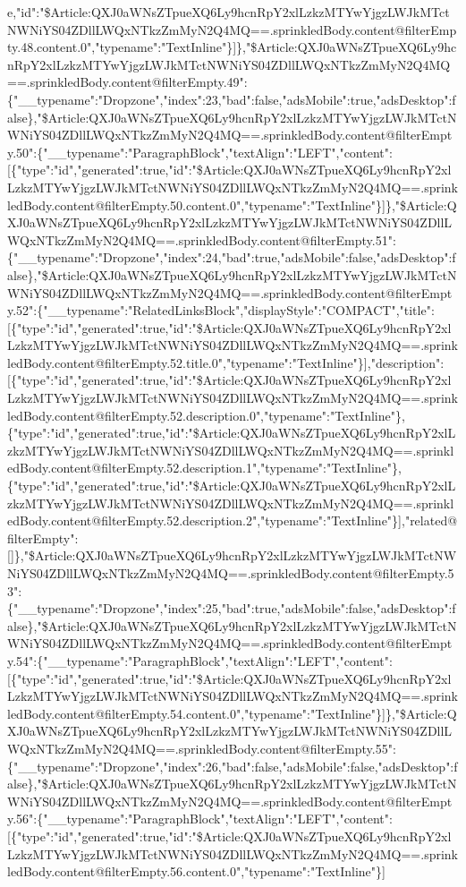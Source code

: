 e,"id":"\$Article:QXJ0aWNsZTpueXQ6Ly9hcnRpY2xlLzkzMTYwYjgzLWJkMTctNWNiYS04ZDllLWQxNTkzZmMyN2Q4MQ==.sprinkledBody.content@filterEmpty.48.content.0","typename":"TextInline"\}{]}\},"\$Article:QXJ0aWNsZTpueXQ6Ly9hcnRpY2xlLzkzMTYwYjgzLWJkMTctNWNiYS04ZDllLWQxNTkzZmMyN2Q4MQ==.sprinkledBody.content@filterEmpty.49":\{"\_\_typename":"Dropzone","index":23,"bad":false,"adsMobile":true,"adsDesktop":false\},"\$Article:QXJ0aWNsZTpueXQ6Ly9hcnRpY2xlLzkzMTYwYjgzLWJkMTctNWNiYS04ZDllLWQxNTkzZmMyN2Q4MQ==.sprinkledBody.content@filterEmpty.50":\{"\_\_typename":"ParagraphBlock","textAlign":"LEFT","content":{[}\{"type":"id","generated":true,"id":"\$Article:QXJ0aWNsZTpueXQ6Ly9hcnRpY2xlLzkzMTYwYjgzLWJkMTctNWNiYS04ZDllLWQxNTkzZmMyN2Q4MQ==.sprinkledBody.content@filterEmpty.50.content.0","typename":"TextInline"\}{]}\},"\$Article:QXJ0aWNsZTpueXQ6Ly9hcnRpY2xlLzkzMTYwYjgzLWJkMTctNWNiYS04ZDllLWQxNTkzZmMyN2Q4MQ==.sprinkledBody.content@filterEmpty.51":\{"\_\_typename":"Dropzone","index":24,"bad":true,"adsMobile":false,"adsDesktop":false\},"\$Article:QXJ0aWNsZTpueXQ6Ly9hcnRpY2xlLzkzMTYwYjgzLWJkMTctNWNiYS04ZDllLWQxNTkzZmMyN2Q4MQ==.sprinkledBody.content@filterEmpty.52":\{"\_\_typename":"RelatedLinksBlock","displayStyle":"COMPACT","title":{[}\{"type":"id","generated":true,"id":"\$Article:QXJ0aWNsZTpueXQ6Ly9hcnRpY2xlLzkzMTYwYjgzLWJkMTctNWNiYS04ZDllLWQxNTkzZmMyN2Q4MQ==.sprinkledBody.content@filterEmpty.52.title.0","typename":"TextInline"\}{]},"description":{[}\{"type":"id","generated":true,"id":"\$Article:QXJ0aWNsZTpueXQ6Ly9hcnRpY2xlLzkzMTYwYjgzLWJkMTctNWNiYS04ZDllLWQxNTkzZmMyN2Q4MQ==.sprinkledBody.content@filterEmpty.52.description.0","typename":"TextInline"\},\{"type":"id","generated":true,"id":"\$Article:QXJ0aWNsZTpueXQ6Ly9hcnRpY2xlLzkzMTYwYjgzLWJkMTctNWNiYS04ZDllLWQxNTkzZmMyN2Q4MQ==.sprinkledBody.content@filterEmpty.52.description.1","typename":"TextInline"\},\{"type":"id","generated":true,"id":"\$Article:QXJ0aWNsZTpueXQ6Ly9hcnRpY2xlLzkzMTYwYjgzLWJkMTctNWNiYS04ZDllLWQxNTkzZmMyN2Q4MQ==.sprinkledBody.content@filterEmpty.52.description.2","typename":"TextInline"\}{]},"related@filterEmpty":{[}{]}\},"\$Article:QXJ0aWNsZTpueXQ6Ly9hcnRpY2xlLzkzMTYwYjgzLWJkMTctNWNiYS04ZDllLWQxNTkzZmMyN2Q4MQ==.sprinkledBody.content@filterEmpty.53":\{"\_\_typename":"Dropzone","index":25,"bad":true,"adsMobile":false,"adsDesktop":false\},"\$Article:QXJ0aWNsZTpueXQ6Ly9hcnRpY2xlLzkzMTYwYjgzLWJkMTctNWNiYS04ZDllLWQxNTkzZmMyN2Q4MQ==.sprinkledBody.content@filterEmpty.54":\{"\_\_typename":"ParagraphBlock","textAlign":"LEFT","content":{[}\{"type":"id","generated":true,"id":"\$Article:QXJ0aWNsZTpueXQ6Ly9hcnRpY2xlLzkzMTYwYjgzLWJkMTctNWNiYS04ZDllLWQxNTkzZmMyN2Q4MQ==.sprinkledBody.content@filterEmpty.54.content.0","typename":"TextInline"\}{]}\},"\$Article:QXJ0aWNsZTpueXQ6Ly9hcnRpY2xlLzkzMTYwYjgzLWJkMTctNWNiYS04ZDllLWQxNTkzZmMyN2Q4MQ==.sprinkledBody.content@filterEmpty.55":\{"\_\_typename":"Dropzone","index":26,"bad":false,"adsMobile":false,"adsDesktop":false\},"\$Article:QXJ0aWNsZTpueXQ6Ly9hcnRpY2xlLzkzMTYwYjgzLWJkMTctNWNiYS04ZDllLWQxNTkzZmMyN2Q4MQ==.sprinkledBody.content@filterEmpty.56":\{"\_\_typename":"ParagraphBlock","textAlign":"LEFT","content":{[}\{"type":"id","generated":true,"id":"\$Article:QXJ0aWNsZTpueXQ6Ly9hcnRpY2xlLzkzMTYwYjgzLWJkMTctNWNiYS04ZDllLWQxNTkzZmMyN2Q4MQ==.sprinkledBody.content@filterEmpty.56.content.0","typename":"TextInline"\}{]}